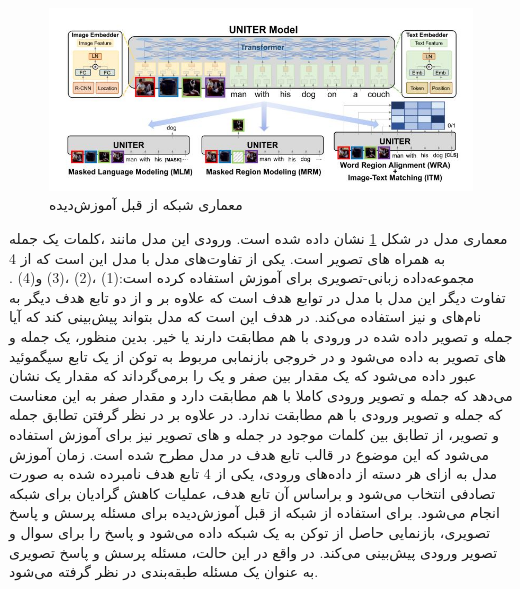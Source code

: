 	\begin{figure}
		\centerline{\includegraphics[scale=0.6]{images/UNITER.JPG}}
		\caption[معماری شبکه از قبل آموزش‌دیده]{معماری شبکه از قبل آموزش‌دیده \cite{chen2020uniter}}
		\label{fig:UNITER}
	\end{figure}
	معماری مدل 
	در شکل
	\ref{fig:UNITER}
	نشان داده شده است. ورودی این مدل مانند
	،کلمات یک جمله به همراه 
	های تصویر است. یکی از تفاوت‌های مدل 
	با مدل 
	این است که از 4 مجموعه‌داده زبانی-تصویری برای آموزش استفاده کرده است:(1)
	،(2)
	،(3)
	و(4)
	.
	تفاوت دیگر این مدل با مدل
	در توابع هدف است که علاوه بر
	و
	از دو تابع هدف دیگر به نام‌های
	و 
	نیز استفاده می‌کند. در
	هدف این است که مدل بتواند پیش‌بینی کند که آیا جمله و تصویر داده شده در ورودی با هم مطابقت دارند یا خیر. بدین منظور، یک جمله و 
	های تصویر به 
	داده می‌شود و در خروجی بازنمابی مربوط به توکن 
	\lr{[CLS]}
	از یک تابع سیگموئید عبور داده می‌شود که یک مقدار بین صفر و یک را برمی‌گرداند که مقدار یک نشان می‌دهد که جمله و تصویر ورودی کاملا با هم مطابقت دارد و مقدار صفر به این معناست که جمله و تصویر ورودی با هم مطابقت ندارد. در 
	علاوه بر ‌در نظر گرفتن تطابق جمله و تصویر، از تطابق بین کلمات موجود در جمله و 
	های تصویر نیز برای آموزش استفاده می‌شود که این موضوع در قالب تابع هدف 
	در مدل مطرح شده است. زمان آموزش مدل 
	به ازای هر دسته از داده‌های ورودی، یکی از 4 تابع هدف نامبرده شده به صورت تصادفی انتخاب می‌شود و براساس آن تابع هدف، عملیات کاهش گرادیان برای شبکه انجام ‌می‌شود. برای استفاده از شبکه از قبل آموزش‌دیده
	برای مسئله پرسش و پاسخ تصویری، بازنمایی حاصل از توکن
	\lr{[CLS]}
	به یک شبکه 
	داده می‌شود و پاسخ را برای سوال و تصویر ورودی پیش‌بینی می‌کند. در واقع در این حالت، مسئله پرسش و پاسخ تصویری به عنوان یک مسئله طبقه‌بندی در نظر گرفته می‌شود.
